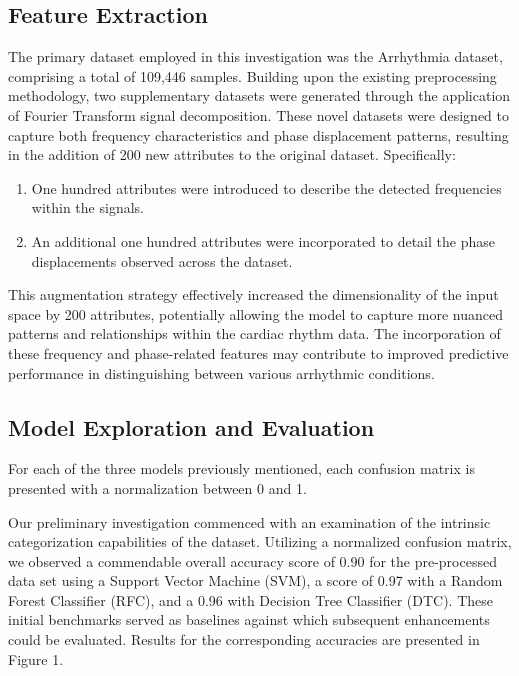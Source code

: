 \documentclass[runningheads]{llncs}
\begin{document}
\subsection{Feature Extraction}

The primary dataset employed in this investigation was the Arrhythmia dataset, comprising a total of 109,446 samples. Building upon the existing preprocessing methodology, two supplementary datasets were generated through the application of Fourier Transform signal decomposition. These novel datasets were designed to capture both frequency characteristics and phase displacement patterns, resulting in the addition of 200 new attributes to the original dataset. Specifically:

\begin{enumerate}
    \item One hundred attributes were introduced to describe the detected frequencies within the signals.
    \item An additional one hundred attributes were incorporated to detail the phase displacements observed across the dataset.
\end{enumerate}

This augmentation strategy effectively increased the dimensionality of the input space by 200 attributes, potentially allowing the model to capture more nuanced patterns and relationships within the cardiac rhythm data. The incorporation of these frequency and phase-related features may contribute to improved predictive performance in distinguishing between various arrhythmic conditions.

\subsection{Model Exploration and Evaluation}

    For each of the three models previously mentioned, each confusion matrix is presented with a normalization between 0 and 1.
    
    Our preliminary investigation commenced with an examination of the intrinsic categorization capabilities of the dataset. Utilizing a normalized confusion matrix, we observed a commendable overall accuracy score of 0.90 for the pre-processed data set using a Support Vector Machine (SVM), a score of 0.97 with a Random Forest Classifier (RFC), and a 0.96 with Decision Tree Classifier (DTC). These initial benchmarks served as baselines against which subsequent enhancements could be evaluated. Results for the corresponding accuracies are presented in Figure 1.
    
\end{document}
